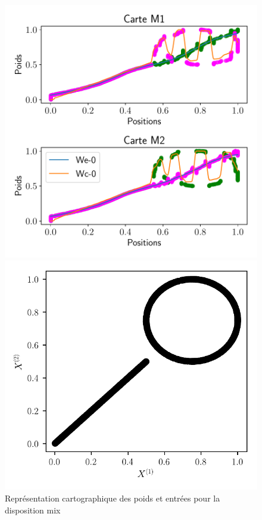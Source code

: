 \begin{figure}
	\begin{minipage}{0.66\textwidth}
		\includegraphics[width=\textwidth]{2som_mix_w.pdf}
	\caption{Représentation cartographique des poids et entrées pour la disposition mix}
	\end{minipage}
	\begin{minipage}{0.33\textwidth}
		\includegraphics[width=\textwidth]{2som_mix_in.pdf}
	\end{minipage}
\end{figure}

